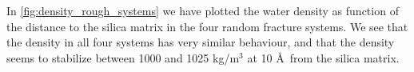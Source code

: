 In \cref{fig:density_rough_systems} we have plotted the water density as function of the distance to the silica matrix in the four random fracture systems. We see that the density in all four systems has very similar behaviour, and that the density seems to stabilize between 1000 and 1025 kg/m$^3$ at 10 \AA\ from the silica matrix.%
%
%
%
